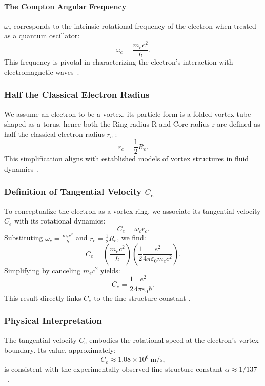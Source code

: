 \paragraph*{The Compton Angular Frequency}
 $\omega_c$ corresponds to the intrinsic rotational frequency of the electron when treated as a quantum oscillator:
\begin{equation}
    \omega_c = \frac{m_e c^2}{\hbar}.
\end{equation}
This frequency is pivotal in characterizing the electron’s interaction with electromagnetic waves~\cite{kelvin1867}.

\subsubsection*{Half the Classical Electron Radius}
We assume an electron to be a vortex, its particle form is a folded vortex tube shaped as a torus, hence both the Ring radius R and Core radius r are defined as half the classical electron radius  $r_c$ :
\begin{equation}
    r_c = \frac{1}{2} R_e.
\end{equation}
This simplification aligns with established models of vortex structures in fluid dynamics~\cite{kleckner2013}.

\subsubsection*{Definition of Tangential Velocity $C_e$}
To conceptualize the electron as a vortex ring, we associate its tangential velocity $C_e$ with its rotational dynamics:
\begin{equation}
    C_e = \omega_c r_c.
\end{equation}
Substituting $\omega_c = \frac{m_e c^2}{\hbar}$ and $r_c = \frac{1}{2} R_e$, we find:
\begin{equation}
    C_e = \left( \frac{m_e c^2}{\hbar} \right) \left( \frac{1}{2} \frac{e^2}{4\pi \varepsilon_0 m_e c^2} \right).\label{eq:equation}
\end{equation}
Simplifying by canceling $m_e c^2$ yields:
\begin{equation}
    C_e = \frac{1}{2} \frac{e^2}{4\pi \varepsilon_0 \hbar}.
\end{equation}
This result directly links $C_e$ to the fine-structure constant \cite{vinen2024}.

\subsubsection*{Physical Interpretation}
The tangential velocity $C_e$ embodies the rotational speed at the electron’s vortex boundary. Its value, approximately:
\begin{equation}
    C_e \approx 1.08 \times 10^6 \ \text{m/s},
\end{equation}
is consistent with the experimentally observed fine-structure constant $\alpha \approx 1/137$~\cite{ricca1998}.

